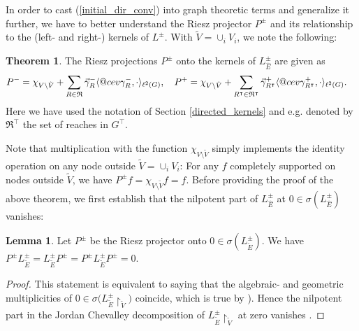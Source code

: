 \documentclass[reqno,12pt,letterpaper]{amsart}
\makeatletter
\numberwithin{equation}{section}
\newcommand{\Lio}{L^{\pm}}
\DeclareRobustCommand{\cev}[1]{%
	\mathpalette\do@cev{#1}%
}
\newcommand{\do@cev}[2]{%
	\fix@cev{#1}{+}%
	\reflectbox{$\m@th#1\vec{\reflectbox{$\fix@cev{#1}{-}\m@th#1#2\fix@cev{#1}{+}$}}$}%
	\fix@cev{#1}{-}%
}
\newcommand{\fix@cev}[2]{%
	\ifx#1\displaystyle
	\mkern#23mu
	\else
	\ifx#1\textstyle
	\mkern#23mu
	\else
	\ifx#1\scriptstyle
	\mkern#22mu
	\else
	\mkern#22mu
	\fi
	\fi
	\fi
}
\newcommand{\1}{\mathds{1}}
\theoremstyle{definition}
\newtheorem{Thm}[Th]{Theorem}
\newtheorem{Lem}[Th]{Lemma}
\makeatother
\begin{document}
\medskip 

 In order to cast (\ref{initial_dir_conv}) into graph theoretic terms and generalize it further, we have to better understand the Riesz projector $P^\pm$ and its relationship to the (left- and right-) kernels of $\Lio$. With $\tilde{V} = \cup_i V_i$, we note the following:
 

	
	

	\begin{Thm}\label{riesz_demystified}
			The Riesz projections $P^\pm$ onto the kernels of $\Lio_{\hat E}$ are given as
		\begin{align}
			P^- &= \chi_{V \setminus \tilde{V}} +  \sum\limits_{R \in \mathfrak{R}}       \vec \gamma^{-}_{R}         \langle \cev \gamma^{-}_{R}, \cdot \rangle_{\ell^2(G)}, \quad
						P^+ =  \chi_{V \setminus \tilde{V}} + \sum\limits_{R^{\intercal} \in \mathfrak{R}^{\intercal}}       \vec\gamma^{+}_{R^{\intercal}}    
			\langle \cev\gamma^{+}_{R^{\intercal}}, \cdot \rangle_{\ell^2(G)}.
		\end{align}
		Here we have used the notation of Section \ref{directed_kernels} and e.g. denoted by $\mathfrak{R}^\intercal$ the set of reaches in $G^\intercal$. 
		\end{Thm}
		Note that multiplication with the  function $ \chi_{V \setminus \tilde{V}}$ simply implements the identity operation on any node outside $\tilde{V} = \cup_i V_i$: For any $f$ completely supported on nodes outside  $\tilde{V} $, we have $P^\pm f = \chi_{V \setminus \tilde{V}} f = f$. Before providing the proof of the above theorem, we first establish
		that the nilpotent part of $\Lio_{\hat{E}}$ at $0 \in \sigma(\Lio_{\hat{E}})$ vanishes:
		\begin{Lem}\label{vanishing_nilpotent} Let $P^\pm$ be the Riesz projector onto $0 \in \sigma( \Lio_{\tilde{E}})$.
			We have $P^\pm \Lio_{\tilde{E}} =  \Lio_{\tilde{E}}P^\pm = P^\pm \Lio_{\tilde{E}}P^\pm = 0$.
		\end{Lem}
		\begin{proof}
			This statement is equivalent to saying that the algebraic- and geometric multiplicities of $0 \in \sigma(\Lio_{\tilde{E}}{\restriction_{\tilde{V}})}$  coincide, which is true by  \cite[Theorem 3.2]{caughveer}).
			Hence
			the nilpotent part  in the Jordan Chevalley decomposition of 
			$\Lio_{\tilde{E}}{\restriction_{\tilde{V}}}$ at zero vanishes
			\cite{CoutyEsterleZarouf2011, kato1995perturbation}.
		\end{proof}
		
\end{document}
